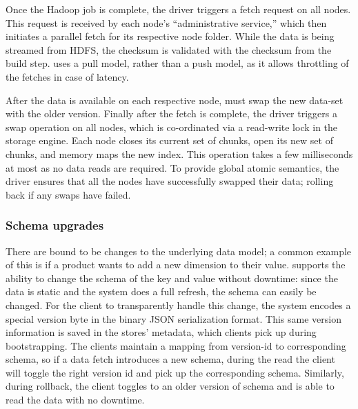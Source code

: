 Once the Hadoop job is complete, the driver triggers a fetch request
on all \projectname{} nodes. This request is received by each node's
``administrative service,'' which then initiates a parallel fetch for
its respective node folder. While the data is being streamed from
HDFS, the checksum is validated with the checksum from the build step.
\projectname{} uses a pull model, rather than a push model, as it allows
throttling of the fetches in case of latency.

After the data is available on each respective node, \projectname{} must swap
the new data-set with the older version. Finally after the fetch is
complete, the driver triggers a swap operation on all nodes, which is
co-ordinated via a read-write lock in the storage engine. Each node
closes its current set of chunks, open its new set of chunks, and
memory maps the new index. This operation takes a few milliseconds at
most as no data reads are required. To provide global atomic
semantics, the driver ensures that all the nodes have successfully
swapped their data; rolling back if any swaps have failed.


\subsubsection{Schema upgrades}
\label{sec:read_only:data_cycle:schema_upgrades}

There are bound to be changes to the underlying data model; a common
example of this is if a product wants to add a new dimension to their
value. \projectname{} supports the ability to change the schema of the
key and value without downtime: since the data is static and the
system does a full refresh, the schema can easily be changed. For the
client to transparently handle this change, the system encodes a
special version byte in the binary JSON serialization format. This
same version information is saved in the stores' metadata, which
clients pick up during bootstrapping. The clients maintain a mapping
from version-id to corresponding schema, so if a data fetch introduces
a new schema, during the read the client will toggle the right version
id and pick up the corresponding schema. Similarly, during rollback,
the client toggles to an older version of schema and is able to read
the data with no downtime. 



